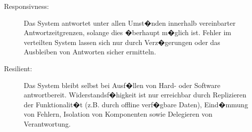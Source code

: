 

\begin{description}
\item[Responsivness:] Das System antwortet unter allen Umst�nden innerhalb vereinbarter Antwortzeitgrenzen, solange dies �berhaupt m�glich ist. Fehler im verteilten System lassen sich nur durch Verz�gerungen oder das Ausbleiben von Antworten sicher ermitteln. 


\item[Resilient:] Das System bleibt selbst bei Ausf�llen von Hard- oder Software antwortbereit. Widerstandsf�higkeit ist nur erreichbar durch Replizieren der Funktionalit�t (z.B. durch offline verf�gbare Daten), Eind�mmung von Fehlern, Isolation von Komponenten sowie Delegieren von Verantwortung. 



\end{description}
